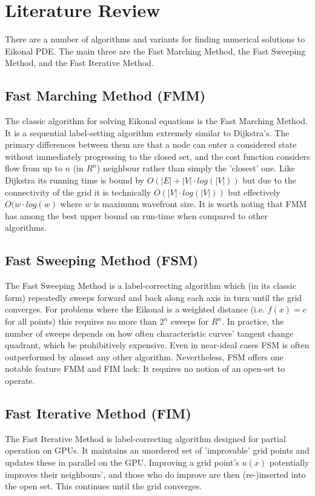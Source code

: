 \documentclass[11pt]{article}       %
\begin{document}
\section{Literature Review} \label{sec:lit_review}

There are a number of algorithms and variants for finding numerical solutions to Eikonal PDE. The main three are the Fast Marching Method, the Fast Sweeping Method, and the Fast Iterative Method.

\subsection{Fast Marching Method (FMM)}\label{sec:FMM}\cite{tsitsiklis1995efficient}\cite{sethian1996fast}
The classic algorithm for solving Eikonal equations is the Fast Marching Method. It is a sequential label-setting algorithm extremely similar to Dijkstra's. The primary differences between them are that a node can enter a considered state without immediately progressing to the closed set, and the cost function considers flow from up to $n$ (in $R^n$) neighbour rather than simply the 'closest' one. Like Dijkstra its running time is bound by $O(|E| + |V| \cdot log(|V|))$ but due to the connectivity of the grid it is technically $O(|V| \cdot log(|V|))$ but effectively $O(w \cdot log(w)$ where $w$ is maximum wavefront size. It is worth noting that FMM has among the best upper bound on run-time when compared to other algorithms.

\subsection{Fast Sweeping Method (FSM)}\label{sec:FSM}\cite{zhao2005fast}
The Fast Sweeping Method is a label-correcting algorithm which (in its classic form) repeatedly sweeps forward and back along each axis in turn until the grid converges. For problems where the Eikonal is a weighted distance (i.e. $f(x) = c$ for all points) this requires no more than $2^n$ sweeps for $R^n$. In practice, the number of sweeps depends on how often characteristic curves' tangent change quadrant, which be prohibitively expensive. Even in near-ideal cases FSM is often outperformed by almost any other algorithm.\cite{jeong2008fast}\cite{gomez2015fast} Nevertheless, FSM offers one notable feature FMM and FIM lack: It requires no notion of an open-set to operate.

\subsection{Fast Iterative Method (FIM)}\label{sec:FIM}
The Fast Iterative Method is label-correcting algorithm designed for partial operation on GPUs. It maintains an unordered set of 'improvable' grid points and updates these in parallel on the GPU. Improving a grid point's $u(x)$ potentially improves their neighbours', and those who do improve are then (re-)inserted into the open set. This continues until the grid converges.
\end{document}
